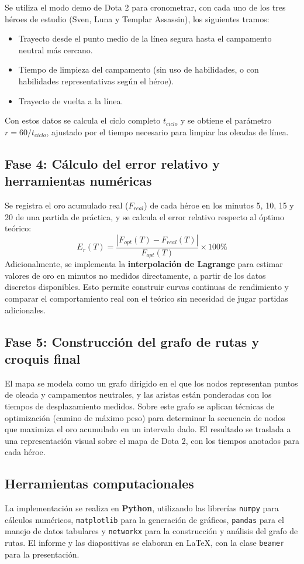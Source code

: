 Se utiliza el modo demo de Dota 2 para cronometrar, con cada uno de los tres héroes de estudio (Sven, Luna y Templar Assassin), los siguientes tramos:
\begin{itemize}
    \item Trayecto desde el punto medio de la línea segura hasta el campamento neutral más cercano.
    \item Tiempo de limpieza del campamento (sin uso de habilidades, o con habilidades representativas según el héroe).
    \item Trayecto de vuelta a la línea.
\end{itemize}
Con estos datos se calcula el ciclo completo \(t_{ciclo}\) y se obtiene el parámetro \(r = 60 / t_{ciclo}\), ajustado por el tiempo necesario para limpiar las oleadas de línea.

\subsection{Fase 4: Cálculo del error relativo y herramientas numéricas}

Se registra el oro acumulado real (\(F_{real}\)) de cada héroe en los minutos 5, 10, 15 y 20 de una partida de práctica, y se calcula el error relativo respecto al óptimo teórico:
\[
E_r(T) = \frac{|F_{opt}(T) - F_{real}(T)|}{F_{opt}(T)} \times 100\%
\]
Adicionalmente, se implementa la \textbf{interpolación de Lagrange} para estimar valores de oro en minutos no medidos directamente, a partir de los datos discretos disponibles. Esto permite construir curvas continuas de rendimiento y comparar el comportamiento real con el teórico sin necesidad de jugar partidas adicionales.

\subsection{Fase 5: Construcción del grafo de rutas y croquis final}

El mapa se modela como un grafo dirigido en el que los nodos representan puntos de oleada y campamentos neutrales, y las aristas están ponderadas con los tiempos de desplazamiento medidos. Sobre este grafo se aplican técnicas de optimización (camino de máximo peso) para determinar la secuencia de nodos que maximiza el oro acumulado en un intervalo dado. El resultado se traslada a una representación visual sobre el mapa de Dota 2, con los tiempos anotados para cada héroe.

\subsection{Herramientas computacionales}

La implementación se realiza en \textbf{Python}, utilizando las librerías \texttt{numpy} para cálculos numéricos, \texttt{matplotlib} para la generación de gráficos, \texttt{pandas} para el manejo de datos tabulares y \texttt{networkx} para la construcción y análisis del grafo de rutas. El informe y las diapositivas se elaboran en \LaTeX{}, con la clase \texttt{beamer} para la presentación.
